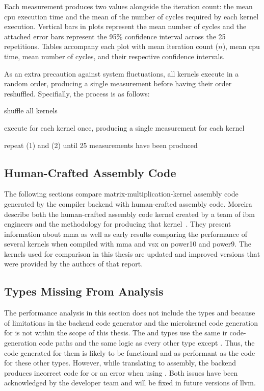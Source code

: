 \documentclass[\main/thesis.tex]{subfiles}
\begin{document}
Each measurement produces two values alongside the iteration count: the mean \gls{cpu} execution time and the mean of the number of cycles required by each kernel execution.
Vertical bars in plots represent the mean number of cycles and the attached error bars represent the 95\% confidence interval across the 25 repetitions.
Tables accompany each plot with mean iteration count ($n$), mean \gls{cpu} time, mean number of cycles, and their respective confidence intervals.

As an extra precaution against system fluctuations, all kernels execute in a random order, producing a single measurement before having their order reshuffled.
Specifially, the process is as follows:
\begin{enumerate*}[itemjoin={{; }}, itemjoin*={{; }}, label=(\arabic*), after={.}]
  \item shuffle all kernels
  \item execute  for each kernel once, producing a single measurement for each kernel
  \item repeat (1) and (2) until 25 measurements have been produced
\end{enumerate*}

\subsection{Human-Crafted Assembly Code}
The following sections compare matrix-multiplication-kernel assembly code generated by the compiler backend with human-crafted assembly code.
Moreira \etal describe both the human-crafted assembly code kernel created by a team of \gls{ibm} engineers and the methodology for producing that kernel~\autocite{moreira2021matrix}.
They present information about \gls{mma} as well as early results comparing the performance of several kernels when compiled with \gls{mma} and \gls{vsx} on \gls{power10} and \gls{power}9.
The kernels used for comparison in this thesis are updated and improved versions that were provided by the authors of that report.

\subsection{Types Missing From Analysis}
The performance analysis in this section does not include the types  and  because of limitations in the backend code generator and the microkernel code generation for  is not within the scope of this thesis.
The  and  types use the same \gls{ir} code-generation code paths and the same logic as every other type except .
Thus, the code generated for them is likely to be functional and as performant as the code for these other types.
However, while translating to assembly, the backend produces incorrect code for  or an error when using .
Both issues have been acknowledged by the developer team and will be fixed in future versions of \gls{llvm}.
\end{document}
